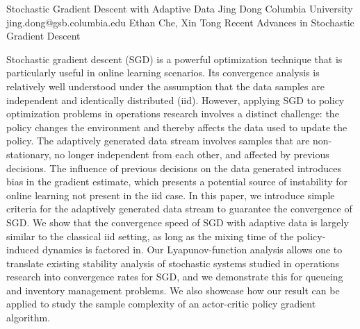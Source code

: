 \begin{talk}
  {Stochastic Gradient Descent with Adaptive Data}%
  {Jing Dong}%
  {Columbia University}%
  {jing.dong@gsb.columbia.edu}%
  {Ethan Che, Xin Tong}%
  {Recent Advances in Stochastic Gradient Descent}%
    
                
Stochastic gradient descent (SGD) is a powerful optimization technique that is particularly useful in online learning scenarios. Its convergence analysis is relatively well understood under the assumption that the data samples are independent and identically distributed (iid). However, applying SGD to policy optimization
problems in operations research involves a distinct challenge: the policy changes the environment and thereby affects the data used to update the policy. The adaptively generated data stream involves samples that are non-stationary, no longer independent from each other, and affected by previous decisions. The influence of previous decisions on the data generated introduces bias in the gradient estimate, which presents a potential source of instability for online learning not present in the iid case. In this paper, we introduce simple criteria for the adaptively generated data stream to guarantee the convergence of SGD. We show that the convergence
speed of SGD with adaptive data is largely similar to the classical iid setting, as long as the mixing time of the policy-induced dynamics is factored in. Our Lyapunov-function analysis allows one to translate existing stability analysis of stochastic systems studied in operations research into convergence rates for SGD, and
we demonstrate this for queueing and inventory management problems. We also showcase how our result can be applied to study the sample complexity of an actor-critic policy gradient algorithm.   


\medskip


\end{talk}
